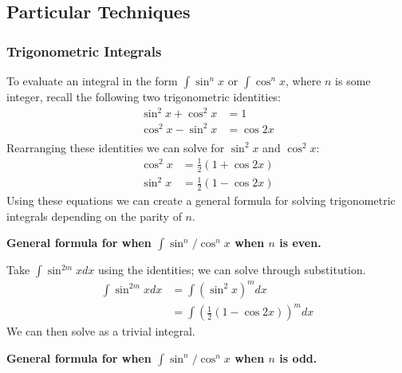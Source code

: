 \documentclass[a4paper]{article}
\begin{document}
  \subsection{Particular Techniques}
  \subsubsection{Trigonometric Integrals}
  To evaluate an integral in the form $\int \sin^n x$ or $\int \cos^n x$, where $n$ is some integer, recall the following two trigonometric identities:
  \[
    \begin{split}
      \sin^2 x + \cos^2 x &= 1 \\
      \cos^2 x - \sin^2 x &= \cos 2x \\
    \end{split}
  \]
  Rearranging these identities we can solve for $\sin^2 x$ and $\cos^2 x$:
  \[
    \begin{split}
      \cos^2 x &= \frac{1 }{2} (1+\cos 2x) \\
      \sin^2 x &= \frac{1 }{2} (1-\cos 2x)
    \end{split}
  \]
  Using these equations we can create a general formula for solving trigonometric integrals depending on the parity of $n$.

  \textbf{General formula for when $\int \sin^n / \cos^n x$ when $n$ is even.}

  Take $\int \sin^{2m} x dx$ using the identities; we can solve through substitution.
  \begin{equation}
   \begin{split}
     \int \sin^{2m} x dx&= \int (\sin^2 x)^m dx \\
                      &= \int (\frac{1 }{2}(1-\cos2x))^m dx
   \end{split} 
  \end{equation}
  We can then solve as a trivial integral.

  \textbf{General formula for when $\int \sin^n / \cos^n x$ when $n$ is odd.}
\end{document}
